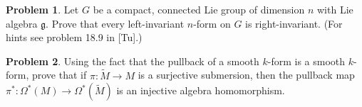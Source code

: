 \documentclass{amsart}
\newcommand{\+}[1]{\ensuremath{\mathbf{#1}}}
\theoremstyle{definition}
\newtheorem{prob}{Problem}
\begin{document}
\begin{prob}
Let $G$ be a compact, connected Lie group of dimension $n$ with
Lie algebra $\mathfrak{g}$.
Prove that every left-invariant $n$-form on $G$ is right-invariant.
(For hints see problem 18.9 in [Tu].)
\end{prob}

\begin{prob}
Using the fact that the pullback of a smooth $k$-form is a
smooth $k$-form, prove that if $\pi: \tilde{M}\to M$
is a surjective submersion, then the pullback map
$\pi^*: \Omega^*(M) \to \Omega^*(\tilde{M})$ is
an injective algebra homomorphism.
\end{prob}
\end{document}

